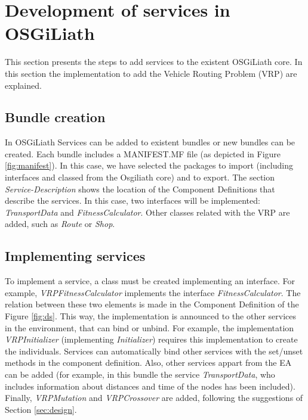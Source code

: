 \documentclass{sig-alternate}
\begin{document}
\section{Development of services in OSGiLiath}
\label{sec:development}
This section presents the steps to add services to the existent OSGiLiath core. In this section the implementation to add the Vehicle Routing Problem (VRP) are explained.

\subsection{Bundle creation}

In OSGiLiath Services can be added to existent bundles or new bundles can be created. Each bundle includes a MANIFEST.MF file (as depicted in Figure \ref{fig:manifest}). In this case, we have selected the packages to import (including interfaces and classed from the Osgiliath core) and to export. The section {\em Service-Description} shows the location of the Component Definitions that describe the services. In this case, two interfaces will be implemented: {\em TransportData} and {\em FitnessCalculator}. Other classes related with the VRP are added, such as {\em Route} or {\em Shop}.

\subsection{Implementing services}
To implement a service, a class must be created implementing an interface. For example, {\em VRPFitnessCalculator} implements the interface {\em FitnessCalculator}. The relation between these two elements is made in the Component Definition of the Figure \ref{fig:ds}. This way, the implementation is announced to the other services in the environment, that can bind or unbind. For example, the implementation {\em VRPInitializer} (implementing {\em Initializer}) requires this implementation to create the individuals. Services can automatically bind other services with the set/unset methods in the component definition. Also, other services appart from the EA can be added (for example, in this bundle the service {\em TransportData}, who includes information about distances and time of the nodes has been included). Finally, {\em VRPMutation} and {\em VRPCrossover} are added, following the suggestions of Section \ref{sec:design}.
\end{document}
